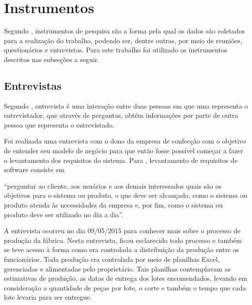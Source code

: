\section{Instrumentos}

\par Segundo , instrumentos de pesquisa são a
forma pela qual os dados são coletados para a realização do trabalho, podendo ser,
dentre outras, por meio de reuniões, questionários e entrevistas. Para
este trabalho foi utilizado os instrumentos descritos nas subseções a seguir.

\subsection{Entrevistas}
\par Segundo , entrevista é
uma interação entre duas pessoas em que uma representa o entrevistador, 
que através de perguntas, obtêm informações por parte de outra pessoa que
representa o entrevistado.





\par Foi realizada uma entrevista com o dono da empresa de confecção com o
objetivo de entender seu modelo de negócio para que então fosse possível começar
a fazer o levantamento dos requisitos do sistema. Para
, levantamento de requisitos de
software consiste em

\begin{citacao}
``perguntar ao cliente, aos usuários e aos demais interessados quais são os
objetivos para o sistema ou produto, o que deve ser alcançado, como o sistema ou
produto atenda às necessidades da empresa e, por fim, como o sistema ou produto
deve ser utilizado no dia a dia''.
\end{citacao} 

\par A entrevista ocorreu no dia 09/05/2015 para conhecer mais sobre o processo de 
produção da fábrica. Nesta entrevista, ficou esclarecido todo processo e também
se teve acesso à forma como era controlada a distribuição da produção entre os funcionários. Toda
produção era controlada por meio de planilhas Excel, gerenciadas e alimentadas pelo proprietário. 
Tais planilhas contemplavam as estimativas de produção, as datas de entrega dos
lotes encomendados, levando em consideração a quantidade de peças por lote, o
corte e também o tempo que cada lote levaria para ser entregue.


